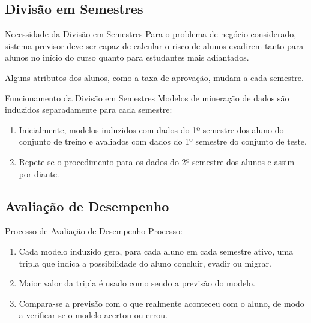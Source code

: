 \subsection{Divisão em Semestres}
\begin{frame}{Necessidade da Divisão em Semestres}
    Para o problema de negócio considerado, sistema previsor deve ser capaz de
    calcular o risco de alunos evadirem tanto para alunos no início do curso quanto
    para estudantes mais adiantados. 

    \vspace{0.5cm}

    Alguns atributos dos alunos, como a taxa de aprovação, mudam a cada semestre.
\end{frame}

\begin{frame}{Funcionamento da Divisão em Semestres}
    Modelos de mineração de dados são induzidos separadamente para cada
    semestre: 
    \begin{enumerate}
        \item Inicialmente, modelos induzidos com dados do 1º semestre dos
             aluno do conjunto de treino e avaliados com dados do 1º semestre do
             conjunto de teste. 
         \item Repete-se o procedimento para os dados do 2º semestre dos alunos e
             assim por diante.
    \end{enumerate}
\end{frame}

\subsection{Avaliação de Desempenho}
\begin{frame}{Processo de Avaliação de Desempenho}
    Processo: 
    \begin{enumerate}
        \item Cada modelo induzido gera, para cada aluno em cada semestre ativo, uma
            tripla que indica a possibilidade do aluno concluir, evadir ou migrar. 
        \item Maior valor da tripla é usado como sendo a previsão do modelo. 
        \item Compara-se a previsão com o que realmente aconteceu com o aluno, de
            modo a verificar se o modelo acertou ou errou. 
    \end{enumerate}
\end{frame}

